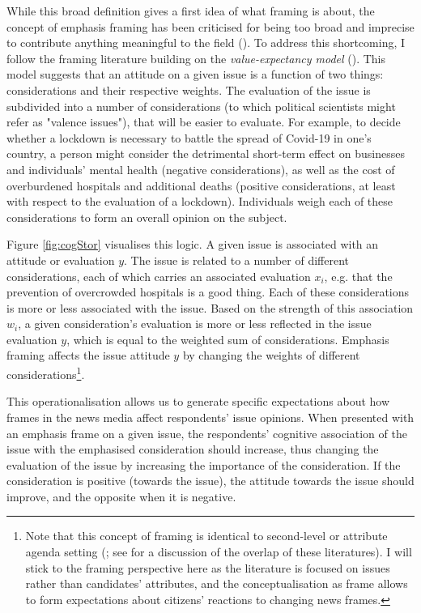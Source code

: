 \documentclass{article}
\begin{document}
While this broad definition gives a first idea of what framing is about, the concept of emphasis framing has been criticised for being too broad and imprecise to contribute anything meaningful to the field (\cite{Scheufele2012}). To address this shortcoming, I follow the framing literature building on the \textit{value-expectancy model} (\cite{Ajzen2000, Nelson1997}). This model suggests that an attitude on a given issue is a function of two things: considerations and their respective weights. The evaluation of the issue is subdivided into a number of considerations (to which political scientists might refer as "valence issues"), that will be easier to evaluate. For example, to decide whether a lockdown is necessary to battle the spread of Covid-19 in one's country, a person might consider the detrimental short-term effect on businesses and individuals' mental health (negative considerations), as well as the cost of overburdened hospitals and additional deaths (positive considerations, at least with respect to the evaluation of a lockdown). Individuals weigh each of these considerations to form an overall opinion on the subject. 

Figure \ref{fig:cogStor} visualises this logic. A given issue is associated with an attitude or evaluation $y$. The issue is related to a number of different considerations, each of which carries an associated evaluation $x_i$, e.g. that the prevention of overcrowded hospitals is a good thing. Each of these considerations is more or less associated with the issue. Based on the strength of this association $w_i$, a given consideration's evaluation is more or less reflected in the issue evaluation $y$, which is equal to the weighted sum of considerations. Emphasis framing affects the issue attitude $y$ by changing the weights of different considerations\footnote{Note that this concept of framing is identical to second-level or attribute agenda setting (\cite{Lopezescobar2017, McCombs2000}; see \cite[174]{Mclaren2018} for a discussion of the overlap of these literatures). I will stick to the framing perspective here as the literature is focused on issues rather than candidates' attributes, and the conceptualisation as frame allows to form expectations about citizens' reactions to changing news frames.}.

This operationalisation allows us to generate specific expectations about how frames in the news media affect respondents' issue opinions. When presented with an emphasis frame on a given issue, the respondents' cognitive association of the issue with the emphasised consideration should increase, thus changing the evaluation of the issue by increasing the importance of the consideration. If the consideration is positive (towards the issue), the attitude towards the issue should improve, and the opposite when it is negative. \medskip
\end{document}
